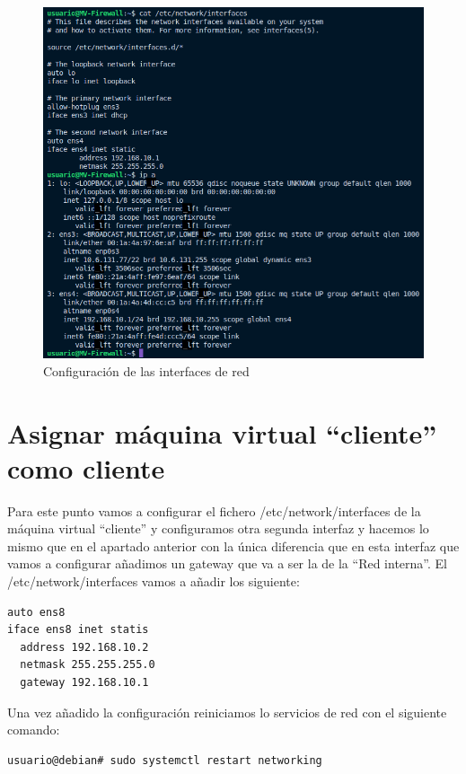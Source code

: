 \documentclass{report}
\begin{document}
  \begin{figure}[H]
    \centering
    \includegraphics[scale=0.6]{img/configuracion_interfaces_firewall.png}
    \caption{Configuración de las interfaces de red}
    \label{fig:configuracion_interfaces}
  \end{figure}

  \cleardoublepage

  \chapter{Asignar máquina virtual “cliente” como cliente}
  Para este punto vamos a configurar el fichero /etc/network/interfaces de la máquina virtual “cliente” y configuramos otra segunda interfaz y hacemos lo mismo que en el apartado anterior con la única diferencia que en esta interfaz que vamos a configurar añadimos un gateway que va a ser la de la “Red interna”.
  El /etc/network/interfaces vamos a añadir los siguiente:

  \begin{verbatim}
auto ens8
iface ens8 inet statis
  address 192.168.10.2
  netmask 255.255.255.0
  gateway 192.168.10.1
  \end{verbatim}

  Una vez añadido la configuración reiniciamos lo servicios de red con el siguiente comando:

  \begin{verbatim}
usuario@debian# sudo systemctl restart networking
  \end{verbatim}
\end{document}
